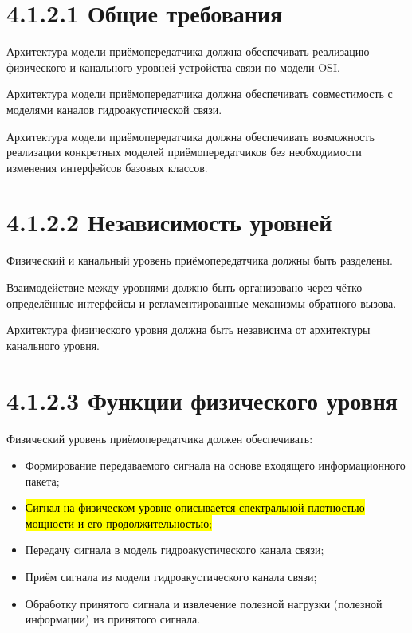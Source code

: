 \section{4.1.2.1 Общие
требования}\label{ux43eux431ux449ux438ux435-ux442ux440ux435ux431ux43eux432ux430ux43dux438ux44f}

Архитектура модели приёмопередатчика должна обеспечивать реализацию
физического и канального уровней устройства связи по модели OSI.

Архитектура модели приёмопередатчика должна обеспечивать совместимость с
моделями каналов гидроакустической связи.

Архитектура модели приёмопередатчика должна обеспечивать возможность
реализации конкретных моделей приёмопередатчиков без необходимости
изменения интерфейсов базовых классов.

\section{4.1.2.2 Независимость
уровней}\label{ux43dux435ux437ux430ux432ux438ux441ux438ux43cux43eux441ux442ux44c-ux443ux440ux43eux432ux43dux435ux439}

Физический и канальный уровень приёмопередатчика должны быть разделены.

Взаимодействие между уровнями должно быть организовано через чётко
определённые интерфейсы и регламентированные механизмы обратного вызова.

Архитектура физического уровня должна быть независима от архитектуры
канального уровня.

\section{4.1.2.3 Функции физического
уровня}\label{ux444ux443ux43dux43aux446ux438ux438-ux444ux438ux437ux438ux447ux435ux441ux43aux43eux433ux43e-ux443ux440ux43eux432ux43dux44f}

Физический уровень приёмопередатчика должен обеспечивать:

\begin{itemize}
\item
  Формирование передаваемого сигнала на основе входящего информационного
  пакета;
\item
  \hl{Сигнал на физическом уровне описывается спектральной плотностью
  мощности и его продолжительностью;}
\item
  Передачу сигнала в модель гидроакустического канала связи;
\item
  Приём сигнала из модели гидроакустического канала связи;
\item
  Обработку принятого сигнала и извлечение полезной нагрузки (полезной
  информации) из принятого сигнала.
\end{itemize}

